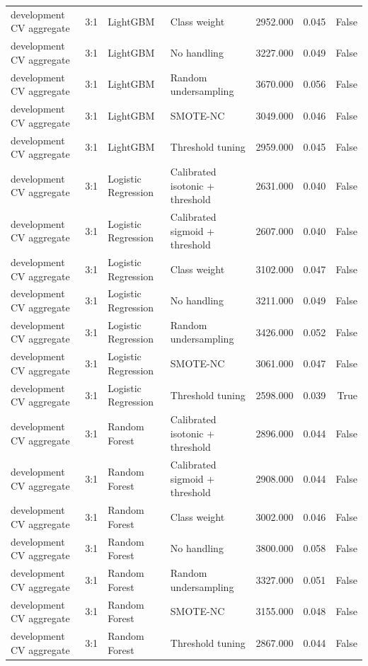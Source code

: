 \begin{tabular}{llllrrr}
development CV aggregate & 3:1 & LightGBM & Class weight & 2952.000 & 0.045 & False \\
development CV aggregate & 3:1 & LightGBM & No handling & 3227.000 & 0.049 & False \\
development CV aggregate & 3:1 & LightGBM & Random undersampling & 3670.000 & 0.056 & False \\
development CV aggregate & 3:1 & LightGBM & SMOTE-NC & 3049.000 & 0.046 & False \\
development CV aggregate & 3:1 & LightGBM & Threshold tuning & 2959.000 & 0.045 & False \\
development CV aggregate & 3:1 & Logistic Regression & Calibrated isotonic + threshold & 2631.000 & 0.040 & False \\
development CV aggregate & 3:1 & Logistic Regression & Calibrated sigmoid + threshold & 2607.000 & 0.040 & False \\
development CV aggregate & 3:1 & Logistic Regression & Class weight & 3102.000 & 0.047 & False \\
development CV aggregate & 3:1 & Logistic Regression & No handling & 3211.000 & 0.049 & False \\
development CV aggregate & 3:1 & Logistic Regression & Random undersampling & 3426.000 & 0.052 & False \\
development CV aggregate & 3:1 & Logistic Regression & SMOTE-NC & 3061.000 & 0.047 & False \\
development CV aggregate & 3:1 & Logistic Regression & Threshold tuning & 2598.000 & 0.039 & True \\
development CV aggregate & 3:1 & Random Forest & Calibrated isotonic + threshold & 2896.000 & 0.044 & False \\
development CV aggregate & 3:1 & Random Forest & Calibrated sigmoid + threshold & 2908.000 & 0.044 & False \\
development CV aggregate & 3:1 & Random Forest & Class weight & 3002.000 & 0.046 & False \\
development CV aggregate & 3:1 & Random Forest & No handling & 3800.000 & 0.058 & False \\
development CV aggregate & 3:1 & Random Forest & Random undersampling & 3327.000 & 0.051 & False \\
development CV aggregate & 3:1 & Random Forest & SMOTE-NC & 3155.000 & 0.048 & False \\
development CV aggregate & 3:1 & Random Forest & Threshold tuning & 2867.000 & 0.044 & False \\

\end{tabular}
